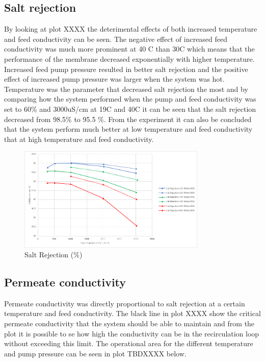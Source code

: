 \subsection{Salt rejection}

By looking at plot XXXX the deterimental effects of both increased temperature and feed conductivity can be seen. The negative effect of increased feed conductivity was much more prominent at 40 C than 30C which means that the performance of the membrane decreased exponentially with higher temperature. Increased feed pump pressure resulted in better salt rejection and the positive effect of increased pump pressure was larger when the system was hot. Temperature was the parameter that decreased salt rejection the most and by comparing how the system performed when the pump and feed conductivity was set to 60\% and 3000uS/cm at 19C and 40C it can be seen that the salt rejection decreased from 98.5\% to 95.5 \%. From the experiment it can also be concluded that the system perform much better at low temperature and feed conductivity that at high temperature and feed conductivity. 

\begin{figure}[H]
    \centering
    \includegraphics[width=0.8\textwidth]{SaltRejection}
    \caption{Salt Rejection (\%)}
    \label{fig:SalrRejectionResult}
\end{figure}
 
\subsection{Permeate conductivity}

Permeate conductivity was directly proportional to salt rejection at a certain temperature and feed conductivity. The black line in plot XXXX show the critical permeate conductivity that the system should be able to maintain and from the plot it is possible to se how high the conductivity can be in the recirculation loop without exceeding this limit. The operational area for the different temperature and pump pressure can be seen in plot TBDXXXX below.

